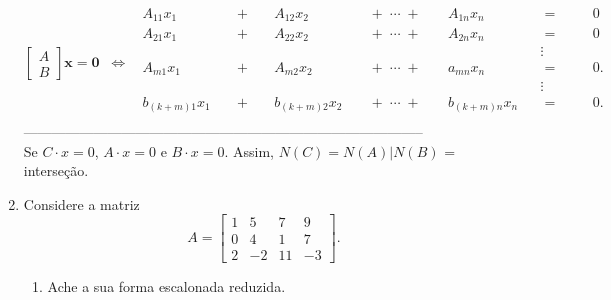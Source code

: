 \documentclass[leqno]{article}
\numberwithin{equation}{section}
\begin{document}
\begin{enumerate}
\begin{sol}
			${\displaystyle \begin{bmatrix} A \\ B \end{bmatrix} \mathbf {x} =\mathbf {0} \;\;\Leftrightarrow
			\;\;{\begin{alignedat}{7}A_{11}x_{1}&&\;+\;&&A_{12}x_{2}&&\;+\;\cdots \;+\;&&A_{1n}x_{n}&&\;=\;&&&0\\A_{21}x_{1}&&\;+\;&&A_{22}x_{2}&&\;+\;\cdots \;+\;&&A_{2n}x_{n}&&\;=\;&&&0\\&&&&&&&&&&\vdots \ \;&&&\\A_{m1}x_{1}&&\;+\;&&A_{m2}x_{2}&&\;+\;\cdots \;+\;&&a_{mn}x_{n}&&\;=\;&&&0{\text{.}}\\&&&&&&&&&&\vdots \ \;&&&\\b_{(k+m)1}x_{1}&&\;+\;&&b_{(k+m)2}x_{2}&&\;+\;\cdots \;+\;&&b_{(k+m)n}x_{n}&&\;=\;&&&0{\text{.}}\\\end{alignedat}}}$ \\
			--------------------------------------------------------------------------------------\\
			\newline
			Se $C \cdot x = 0$, $A \cdot x = 0$ e $B \cdot x = 0$. Assim, $N(C) = N(A) | N(B)$ = interseção.
		\end{sol} 
		
		\item Considere a matriz
		$$A = \begin{bmatrix} 
			1 & 5 & 7 & 9\\
			0 & 4 & 1 & 7 \\
			2 & -2 & 11 & -3
		\end{bmatrix}.$$
		
		\begin{enumerate}
			
			\item Ache a sua forma escalonada reduzida.
			

\end{enumerate}
\end{enumerate}
\end{document}
